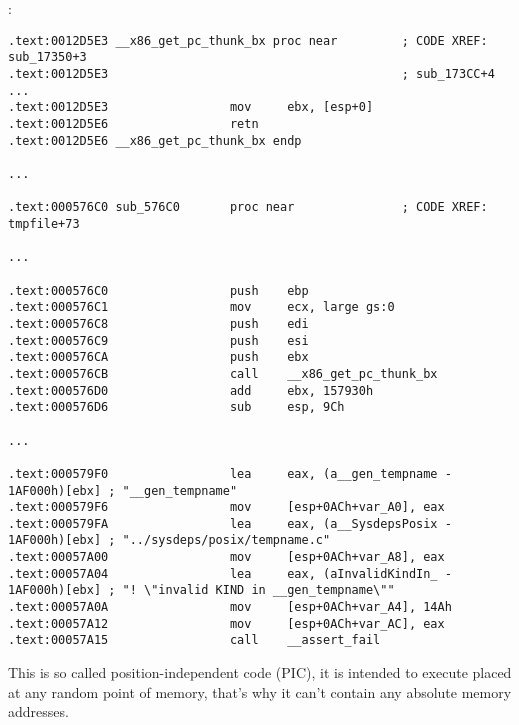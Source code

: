 ﻿\section{\CapitalPICcode}
\index{\PICcode}
\label{sec:PIC}

:

\begin{lstlisting}[caption=libc-2.17.so x86]
.text:0012D5E3 __x86_get_pc_thunk_bx proc near         ; CODE XREF: sub_17350+3
.text:0012D5E3                                         ; sub_173CC+4 ...
.text:0012D5E3                 mov     ebx, [esp+0]
.text:0012D5E6                 retn
.text:0012D5E6 __x86_get_pc_thunk_bx endp

...

.text:000576C0 sub_576C0       proc near               ; CODE XREF: tmpfile+73

...

.text:000576C0                 push    ebp
.text:000576C1                 mov     ecx, large gs:0
.text:000576C8                 push    edi
.text:000576C9                 push    esi
.text:000576CA                 push    ebx
.text:000576CB                 call    __x86_get_pc_thunk_bx
.text:000576D0                 add     ebx, 157930h
.text:000576D6                 sub     esp, 9Ch

...

.text:000579F0                 lea     eax, (a__gen_tempname - 1AF000h)[ebx] ; "__gen_tempname"
.text:000579F6                 mov     [esp+0ACh+var_A0], eax
.text:000579FA                 lea     eax, (a__SysdepsPosix - 1AF000h)[ebx] ; "../sysdeps/posix/tempname.c"
.text:00057A00                 mov     [esp+0ACh+var_A8], eax
.text:00057A04                 lea     eax, (aInvalidKindIn_ - 1AF000h)[ebx] ; "! \"invalid KIND in __gen_tempname\""
.text:00057A0A                 mov     [esp+0ACh+var_A4], 14Ah
.text:00057A12                 mov     [esp+0ACh+var_AC], eax
.text:00057A15                 call    __assert_fail
\end{lstlisting}

{This is so called position-independent code (PIC), it is intended to execute placed at any random point of memory, that's why it can't contain any absolute memory addresses}.

